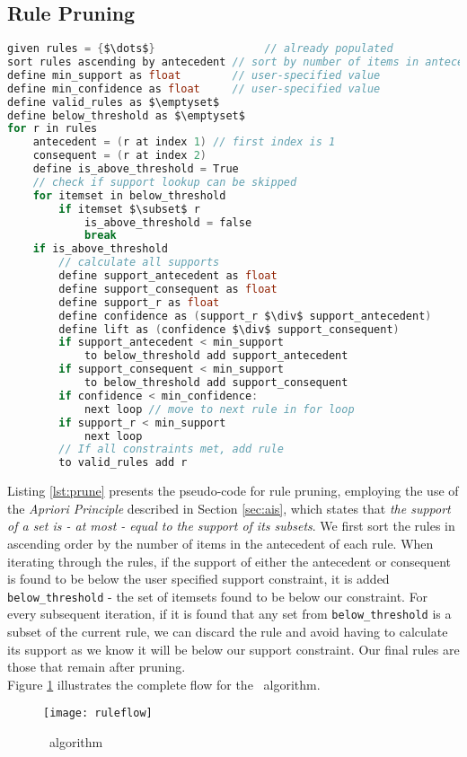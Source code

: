\subsection{Rule Pruning}
\begin{lstlisting}[language=C, mathescape=true, caption=Rule Pruning, label=lst:prune]
given rules = {$\dots$}                 // already populated
sort rules ascending by antecedent // sort by number of items in antecedent
define min_support as float        // user-specified value
define min_confidence as float     // user-specified value
define valid_rules as $\emptyset$
define below_threshold as $\emptyset$
for r in rules
    antecedent = (r at index 1) // first index is 1
    consequent = (r at index 2)
    define is_above_threshold = True 
    // check if support lookup can be skipped
    for itemset in below_threshold
        if itemset $\subset$ r
            is_above_threshold = false
            break
    if is_above_threshold
        // calculate all supports
        define support_antecedent as float
        define support_consequent as float
        define support_r as float 
        define confidence as (support_r $\div$ support_antecedent)
        define lift as (confidence $\div$ support_consequent)
        if support_antecedent < min_support
            to below_threshold add support_antecedent
        if support_consequent < min_support
            to below_threshold add support_consequent
        if confidence < min_confidence:
            next loop // move to next rule in for loop
        if support_r < min_support
            next loop 
        // If all constraints met, add rule
        to valid_rules add r
\end{lstlisting}
Listing \ref{lst:prune} presents the pseudo-code for rule pruning, employing the use of the \textit{Apriori Principle} described in Section \ref{sec:ais}, which states that \textit{the support of a set is - at most - equal to the support of its subsets}. We first sort the rules in ascending order by the number of items in the antecedent of each rule. When iterating through the rules, if the support of either the antecedent or consequent is found to be below the user specified support constraint, it is added \texttt{below\_threshold} - the set of itemsets found to be below our constraint. For every subsequent iteration, if it is found that any set from \texttt{below\_threshold} is a subset of the current rule, we can discard the rule and avoid having to calculate its support as we know it will be below our support constraint. Our final rules are those that remain after pruning.\\
Figure \ref{fig:algorithm_flow} illustrates the complete flow for the \algo\ algorithm.
\begin{figure}[H]
\centering
\texttt{[image: ruleflow]}
\caption{\algo\ algorithm}
\label{fig:algorithm_flow}
\end{figure}

